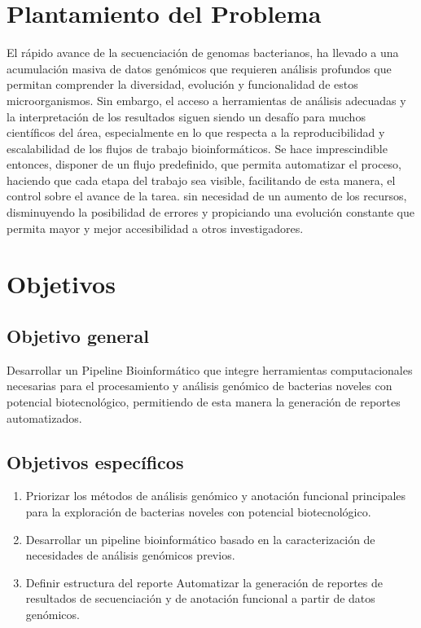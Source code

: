\documentclass[12pt]{article}
\begin{document}
\newpage
\section{Plantamiento del Problema}
El rápido avance  de la secuenciación de genomas bacterianos, ha 
llevado a una acumulación masiva de datos genómicos que requieren 
análisis profundos que permitan comprender la diversidad, evolución 
y funcionalidad de estos microorganismos. Sin embargo, el acceso a 
herramientas de análisis adecuadas y la interpretación de los 
resultados siguen siendo un desafío para muchos científicos del 
área, especialmente en lo que respecta a la reproducibilidad y 
escalabilidad de los flujos de trabajo bioinformáticos. Se hace 
imprescindible entonces, disponer de un flujo predefinido, que 
permita automatizar el proceso, haciendo que cada etapa del trabajo 
sea visible, facilitando de esta manera, el control sobre el 
avance de la tarea. sin necesidad de un aumento de los recursos, 
disminuyendo la posibilidad de errores y  propiciando una evolución 
constante que permita mayor y mejor accesibilidad a otros 
investigadores.

\newpage
\section{Objetivos}
\subsection{Objetivo general}
Desarrollar un Pipeline Bioinformático que integre herramientas  computacionales 
necesarias para el procesamiento y  análisis genómico de bacterias noveles con potencial 
biotecnológico, permitiendo de esta manera la generación de reportes automatizados.
\subsection{Objetivos específicos}

\begin{enumerate}
    \item Priorizar los métodos de análisis genómico y anotación funcional 
        principales para la exploración de bacterias noveles con potencial biotecnológico.
    \item Desarrollar un pipeline bioinformático basado en la caracterización de 
        necesidades de análisis genómicos previos.
    \item Definir estructura del reporte Automatizar la generación de reportes de 
        resultados de secuenciación y de anotación funcional a partir de datos genómicos.
\end{enumerate}
\end{document}
